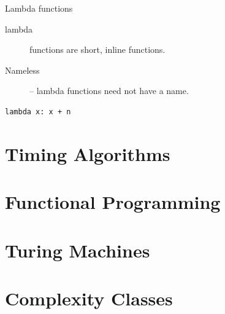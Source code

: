 \begin{frame}[fragile]{Lambda functions}
	\begin{description}
	  \item[lambda] functions are short, inline functions.
	  \item[Nameless] -- lambda functions need not have a name.
	\end{description}
	\begin{verbatim}
lambda x: x + n
  \end{verbatim}
\end{frame}

\section{Timing Algorithms}

\section{Functional Programming}

\section{Turing Machines}

\section{Complexity Classes}